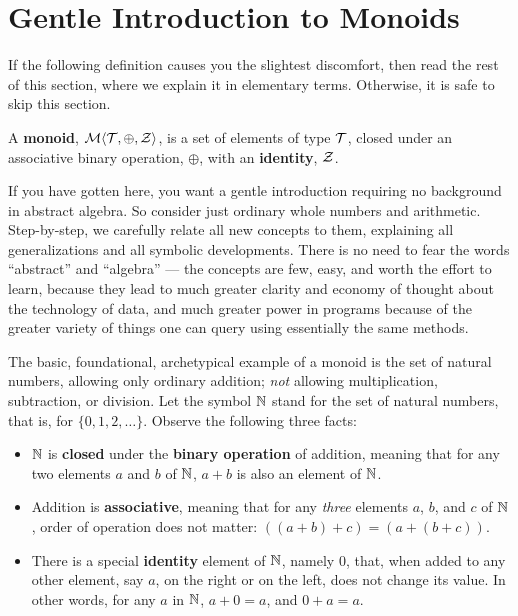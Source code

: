 \section{\color{Red}Gentle Introduction to Monoids}


If the following definition causes you the slightest discomfort, then read the rest of this section, where we explain it in elementary terms. Otherwise, it is safe to skip this section.


\begin{definition}
  A \textbf{monoid}, $\mathcal{M}\langle{\mathcal{T}},{\oplus},{\mathcal{Z}}\rangle$, is a set of elements of type $\mathcal{T}$, closed under an associative binary operation, $\oplus$, with an \textbf{identity}, $\mathcal{Z}$. 
  \label{def:monoid}
\end{definition}


If you have gotten here, you want a gentle introduction requiring no background in abstract algebra. So consider just ordinary whole numbers and arithmetic. Step-by-step, we carefully relate all new concepts to them, explaining all  generalizations and all symbolic developments. There is no need to fear the words ``abstract'' and ``algebra'' --- the concepts are few, easy, and worth the effort to learn, because they lead to much greater clarity and economy of thought about the technology of data, and much greater power in programs because of the greater variety of things one can query using essentially the same methods. 


The basic, foundational, archetypical example of a monoid is the set of natural numbers, allowing only ordinary addition; \emph{not} allowing multiplication, subtraction, or division. Let the symbol $\mathbb{N}$ stand for the set of natural numbers, that is, for $\{0,1,2,\ldots\}$. 
Observe the following three facts:
\begin{itemize}
  \item $\mathbb{N}$ is \textbf{closed} under the \textbf{binary operation} of addition, meaning that for any two elements $a$ and $b$ of $\mathbb{N}$, $a+b$ is also an element of $\mathbb{N}$.
	\item Addition is \textbf{associative}, meaning that for any \emph{three} elements $a$, $b$, and $c$ of $\mathbb{N}$, order of operation does not matter: \mbox{$((a+b)+c)=(a+(b+c))$}. 
	\item There is a special \textbf{identity} element of $\mathbb{N}$, namely $0$, that, when added to any other element, say $a$, on the right or on the left, does not change its value. In other words, for any $a$ in $\mathbb{N}$, $a+0=a$, and $0+a=a$.
\end{itemize}


